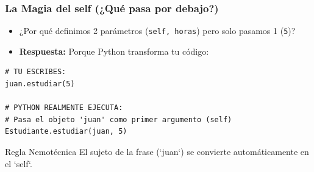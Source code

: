 \documentclass[11pt]{beamer}
\begin{document}
\begin{frame}[fragile]\frametitle{La Magia del self (¿Qué pasa por debajo?)}
\begin{itemize}
\item ¿Por qué definimos 2 parámetros (\lstinline|self, horas|) pero solo pasamos 1 (\lstinline|5|)?
\item \textbf{Respuesta:} Porque Python transforma tu código:
\end{itemize}
\begin{lstlisting}[basicstyle=\small]
# TU ESCRIBES:
juan.estudiar(5)

# PYTHON REALMENTE EJECUTA:
# Pasa el objeto 'juan' como primer argumento (self)
Estudiante.estudiar(juan, 5)
\end{lstlisting}
\begin{block}{Regla Nemotécnica}
El sujeto de la frase (`juan`) se convierte automáticamente en el `self`.
\end{block}
\end{frame}
\end{document}
